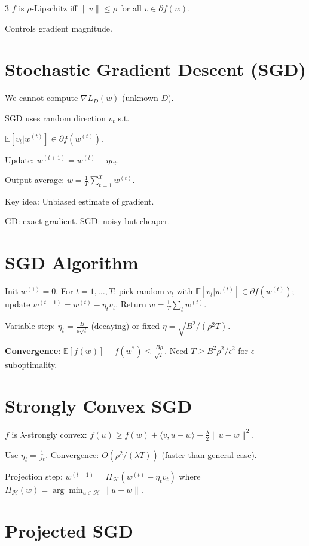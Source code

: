 \documentclass[8pt,fleqn]{extarticle}
\begin{document}
\begin{multicols}{3}
$f$ is $\rho$-Lipschitz iff
$\|v\|\le\rho$ for all $v\in\partial f(w)$.

Controls gradient magnitude.


\section*{Stochastic Gradient Descent (SGD)}

We cannot compute $\nabla L_D(w)$ (unknown $D$).

SGD uses random direction $v_t$ s.t.

$\mathbb E[v_t|w^{(t)}]\in\partial f(w^{(t)})$.

Update:
$w^{(t+1)}=w^{(t)}-\eta v_t$.

Output average:
$\bar w=\frac1T\sum_{t=1}^T w^{(t)}$.

Key idea:
Unbiased estimate of gradient.

GD: exact gradient.
SGD: noisy but cheaper.


\section*{SGD Algorithm}

Init $w^{(1)}=0$. For $t=1,\dots,T$: pick random $v_t$ with $\mathbb E[v_t|w^{(t)}]\in\partial f(w^{(t)})$; update $w^{(t+1)}=w^{(t)}-\eta_t v_t$. Return $\bar w=\frac1T\sum_t w^{(t)}$.

Variable step: $\eta_t=\frac{B}{\rho\sqrt{t}}$ (decaying) or fixed $\eta=\sqrt{B^2/(\rho^2 T)}$.

\textbf{Convergence}: $\mathbb E[f(\bar w)]-f(w^*)\le\frac{B\rho}{\sqrt{T}}$. Need $T\ge B^2\rho^2/\epsilon^2$ for $\epsilon$-suboptimality.

\section*{Strongly Convex SGD}

$f$ is $\lambda$-strongly convex: $f(u)\ge f(w)+\langle v,u-w\rangle+\frac\lambda2\|u-w\|^2$.

Use $\eta_t=\frac1{\lambda t}$. Convergence: $O(\rho^2/(\lambda T))$ (faster than general case).

Projection step: $w^{(t+1)}=\Pi_{\mathcal H}(w^{(t)}-\eta_t v_t)$ where $\Pi_{\mathcal H}(w)=\arg\min_{u\in\mathcal H}\|u-w\|$.


\section*{Projected SGD}


\end{multicols}
\end{document}
